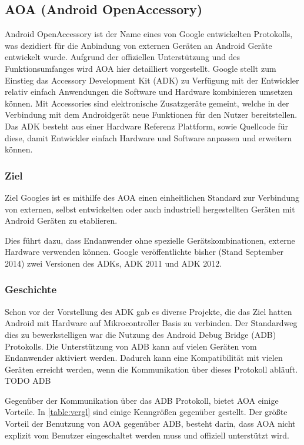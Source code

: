 \documentclass[12pt,journal,compsoc]{IEEEtran}
\begin{document}
\subsection{AOA (Android OpenAccessory)}
Android OpenAccessory ist der Name eines von Google entwickelten Protokolls, was 
dezidiert für die Anbindung von externen Geräten an Android Geräte entwickelt wurde.
Aufgrund der offiziellen Unterstützung und des Funktionsumfanges wird AOA hier detailliert vorgestellt.
Google stellt zum Einstieg das Accessory Development Kit (ADK) zu Verfügung mit der Entwickler relativ einfach Anwendungen die Software und Hardware kombinieren umsetzen können.
Mit Accessories sind elektronische Zusatzgeräte gemeint, welche in der Verbindung mit dem Androidgerät neue Funktionen für den Nutzer bereitstellen.
Das ADK besteht aus einer Hardware Referenz Plattform, sowie Quellcode für diese, damit 
Entwickler einfach Hardware und Software anpassen und erweitern können.
\cite{developaoa}
\subsubsection{Ziel}
Ziel Googles ist es mithilfe des AOA einen einheitlichen Standard zur Verbindung von externen, selbst entwickelten oder auch industriell hergestellten Geräten mit Android Geräten zu etablieren.

Dies führt dazu, dass Endanwender ohne spezielle Gerätskombinationen, externe Hardware verwenden können.
Google veröffentlichte bisher (Stand September 2014) zwei Versionen des ADKs, ADK 2011 und ADK 2012. 

\subsubsection{Geschichte}
Schon vor der Vorstellung des ADK gab es diverse Projekte, die das Ziel hatten Android mit Hardware auf Mikrocontroller Basis zu verbinden.
Der Standardweg dies zu bewerkstelligen war die Nutzung des Android Debug Bridge (ADB) Protokolls.
Die Unterstützung von ADB kann auf vielen Geräten vom Endanwender aktiviert werden. Dadurch kann eine Kompatibilität mit vielen Geräten erreicht werden, wenn die Kommunikation über dieses Protokoll abläuft. TODO ADB

Gegenüber der Kommunikation über das ADB Protokoll, bietet AOA einige Vorteile. In \ref{table:vergl} sind einige Kenngrößen gegenüber gestellt. Der größte Vorteil der Benutzung von AOA gegenüber ADB, besteht darin, dass AOA nicht explizit vom Benutzer eingeschaltet werden muss und offiziell unterstützt wird.
\end{document}
